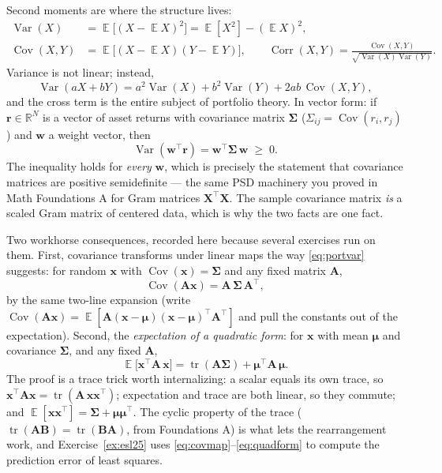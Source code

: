 \documentclass[11pt]{article}
\numberwithin{equation}{section}
\theoremstyle{plain}
\theoremstyle{definition}
\theoremstyle{remark}
\newcounter{exercise}
\DeclareMathOperator{\E}{\mathbb{E}}
\DeclareMathOperator{\Var}{Var}
\DeclareMathOperator{\Cov}{Cov}
\DeclareMathOperator{\Corr}{Corr}
\DeclareMathOperator{\tr}{tr}
\newcommand{\R}{\mathbb{R}}
\newcommand{\x}{\bm{x}}
\newcommand{\bmu}{\bm{\mu}}
\newcommand{\bSigma}{\bm{\Sigma}}
\newcommand{\T}{\top}
\begin{document}
Second moments are where the structure lives:
\begin{align}
\Var(X) &= \E\big[(X - \E X)^2\big] = \E[X^2] - (\E X)^2,\\
\Cov(X,Y) &= \E\big[(X - \E X)(Y - \E Y)\big], \qquad
\Corr(X,Y) = \frac{\Cov(X,Y)}{\sqrt{\Var(X)\Var(Y)}}.
\end{align}
Variance is not linear; instead,
\begin{equation}
\Var(aX + bY) = a^2 \Var(X) + b^2 \Var(Y) + 2ab\,\Cov(X,Y),
\label{eq:varsum}
\end{equation}
and the cross term is the entire subject of portfolio theory. In vector form: if $\bm{r} \in \R^N$ is a vector of asset returns with covariance matrix $\bSigma$ ($\Sigma_{ij} = \Cov(r_i, r_j)$) and $\bm{w}$ a weight vector, then
\begin{equation}
\Var(\bm{w}^\T \bm{r}) = \bm{w}^\T \bSigma\, \bm{w} \;\ge\; 0.
\label{eq:portvar}
\end{equation}
The inequality holds for \emph{every} $\bm{w}$, which is precisely the statement that covariance matrices are positive semidefinite --- the same PSD machinery you proved in Math Foundations A for Gram matrices $\bm{X}^\T\bm{X}$. The sample covariance matrix \emph{is} a scaled Gram matrix of centered data, which is why the two facts are one fact.

Two workhorse consequences, recorded here because several exercises run on them. First, covariance transforms under linear maps the way \eqref{eq:portvar} suggests: for random $\x$ with $\Cov(\x) = \bSigma$ and any fixed matrix $\bm{A}$,
\begin{equation}
\Cov(\bm{A}\x) = \bm{A}\, \bSigma\, \bm{A}^\T ,
\label{eq:covmap}
\end{equation}
by the same two-line expansion (write $\Cov(\bm{A}\x) = \E[\bm{A}(\x - \bmu)(\x - \bmu)^\T \bm{A}^\T]$ and pull the constants out of the expectation). Second, the \emph{expectation of a quadratic form}: for $\x$ with mean $\bmu$ and covariance $\bSigma$, and any fixed $\bm{A}$,
\begin{equation}
\E\big[\x^\T \bm{A}\, \x\big] = \tr(\bm{A} \bSigma) + \bmu^\T \bm{A}\, \bmu .
\label{eq:quadform}
\end{equation}
The proof is a trace trick worth internalizing: a scalar equals its own trace, so $\x^\T \bm{A} \x = \tr(\bm{A}\, \x\x^\T)$; expectation and trace are both linear, so they commute; and $\E[\x\x^\T] = \bSigma + \bmu\bmu^\T$. The cyclic property of the trace ($\tr(\bm{AB}) = \tr(\bm{BA})$, from Foundations A) is what lets the rearrangement work, and Exercise~\ref{ex:esl25} uses \eqref{eq:covmap}--\eqref{eq:quadform} to compute the prediction error of least squares.
\end{document}

